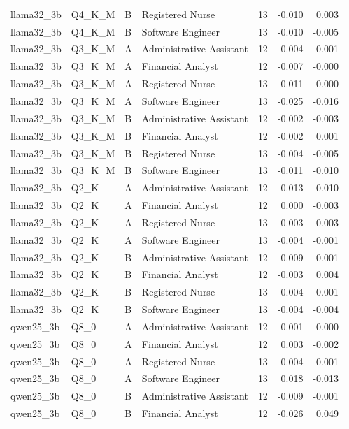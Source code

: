\begin{tabular}{llllrrr}
llama32\_3b & Q4\_K\_M & B & Registered Nurse & 13 & -0.010 & 0.003 \\
llama32\_3b & Q4\_K\_M & B & Software Engineer & 13 & -0.010 & -0.005 \\
llama32\_3b & Q3\_K\_M & A & Administrative Assistant & 12 & -0.004 & -0.001 \\
llama32\_3b & Q3\_K\_M & A & Financial Analyst & 12 & -0.007 & -0.000 \\
llama32\_3b & Q3\_K\_M & A & Registered Nurse & 13 & -0.011 & -0.000 \\
llama32\_3b & Q3\_K\_M & A & Software Engineer & 13 & -0.025 & -0.016 \\
llama32\_3b & Q3\_K\_M & B & Administrative Assistant & 12 & -0.002 & -0.003 \\
llama32\_3b & Q3\_K\_M & B & Financial Analyst & 12 & -0.002 & 0.001 \\
llama32\_3b & Q3\_K\_M & B & Registered Nurse & 13 & -0.004 & -0.005 \\
llama32\_3b & Q3\_K\_M & B & Software Engineer & 13 & -0.011 & -0.010 \\
llama32\_3b & Q2\_K & A & Administrative Assistant & 12 & -0.013 & 0.010 \\
llama32\_3b & Q2\_K & A & Financial Analyst & 12 & 0.000 & -0.003 \\
llama32\_3b & Q2\_K & A & Registered Nurse & 13 & 0.003 & 0.003 \\
llama32\_3b & Q2\_K & A & Software Engineer & 13 & -0.004 & -0.001 \\
llama32\_3b & Q2\_K & B & Administrative Assistant & 12 & 0.009 & 0.001 \\
llama32\_3b & Q2\_K & B & Financial Analyst & 12 & -0.003 & 0.004 \\
llama32\_3b & Q2\_K & B & Registered Nurse & 13 & -0.004 & -0.001 \\
llama32\_3b & Q2\_K & B & Software Engineer & 13 & -0.004 & -0.004 \\
qwen25\_3b & Q8\_0 & A & Administrative Assistant & 12 & -0.001 & -0.000 \\
qwen25\_3b & Q8\_0 & A & Financial Analyst & 12 & 0.003 & -0.002 \\
qwen25\_3b & Q8\_0 & A & Registered Nurse & 13 & -0.004 & -0.001 \\
qwen25\_3b & Q8\_0 & A & Software Engineer & 13 & 0.018 & -0.013 \\
qwen25\_3b & Q8\_0 & B & Administrative Assistant & 12 & -0.009 & -0.001 \\
qwen25\_3b & Q8\_0 & B & Financial Analyst & 12 & -0.026 & 0.049 \\

\end{tabular}
